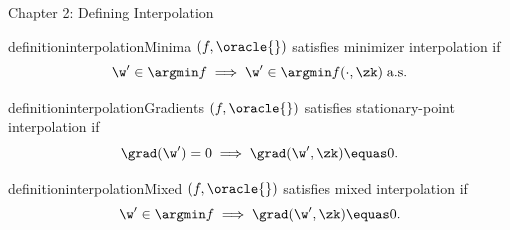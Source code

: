 \documentclass[mathserif,notheorems, hyperref={colorlinks, citecolor=blue, urlcolor=blue, linkcolor=blue}]{beamer}
\begin{document}
    \begin{frame}{Chapter 2: Defining Interpolation}
        \begin{minipage}{0.72\textwidth}
        \vspace{-5.25ex}
            \begin{restatable}{definition}{interpolationMinima}\label{def:interpolation-minima}
                \( (f, \oracle{}) \) satisfies minimizer interpolation if 
                \[ \w' \in \argmin f \implies \w' \in \argmin f(\cdot, \zk) \; \text{a.s.}  \]
            \end{restatable}%
            \vspace{-1ex}
            \begin{restatable}{definition}{interpolationGradients}\label{def:interpolation-gradients}
                \( (f, \oracle{}) \) satisfies stationary-point interpolation if 
                \[ \grad(\w') = 0 \implies \grad(\w', \zk) \equas 0. \]
            \end{restatable}%
            \vspace{-1ex}
            \begin{restatable}{definition}{interpolationMixed}\label{def:interpolation-mixed}
                \( (f, \oracle{}) \) satisfies mixed interpolation if 
                \[ \w' \in \argmin f \implies \grad(\w', \zk) \equas 0. \]
            \end{restatable}
        \end{minipage} 
        \begin{minipage}{0.25\textwidth}
            \centering
             

            

            
        \end{minipage}
    \end{frame}
\end{document}
